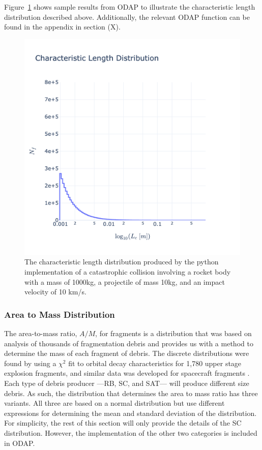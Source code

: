 \documentclass[a4paper, 12pt]{article}
\begin{document}
Figure~\ref{fig:N_f_v_L_c} shows sample results from ODAP to illustrate the characteristic length distribution described above. Additionally, the relevant ODAP function can be found in the appendix in section (X).
\begin{figure}[H]
	\centering
	\includegraphics[scale=0.3, trim=0cm 0cm 0cm 10cm]{N_f_vs_L_c}
	\caption{The characteristic length distribution produced by the python implementation of a catastrophic collision involving a rocket body with a mass of 1000kg, a projectile of mass 10kg, and an impact velocity of 10 km/s.}
	\label{fig:N_f_v_L_c}
\end{figure}

\subsubsection{Area to Mass Distribution }

The area-to-mass ratio, $A/M$, for fragments is a distribution that was based on analysis of thousands of fragmentation debris and provides us with a method to determine the mass of each fragment of debris. The discrete distributions were found by using a $\chi^2$ fit to orbital decay characteristics for 1,780 upper stage explosion fragments, and similar data was developed for spacecraft fragments \citep{johnson_nasas_2001}. Each type of debris producer ---RB, SC, and SAT--- will produce different size debris. As such, the distribution that determines the area to mass ratio has three variants. All three are based on a normal distribution but use different expressions for determining the mean and standard deviation of the distribution. For simplicity, the rest of this section will only provide the details of the SC distribution. However, the implementation of the other two categories is included in ODAP.
\end{document}
